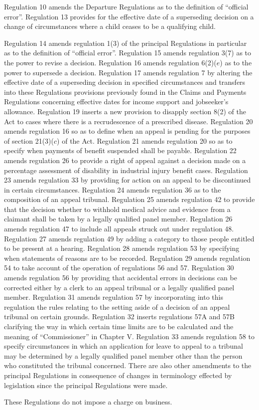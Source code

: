 \documentclass[12pt,a4paper]{article}
\begin{document}
Regulation 10 amends the Departure Regulations as to the definition of “official error”. Regulation 13 provides for the effective date of a superseding decision on a change of circumstances where a child ceases to be a qualifying child.

Regulation 14 amends regulation 1(3) of the principal Regulations in particular as to the definition of “official error”. Regulation 15 amends regulation 3(7) as to the power to revise a decision. Regulation 16 amends regulation 6(2)($e$)  as to the power to supersede a decision. Regulation 17 amends regulation 7 by altering the effective date of a superseding decision in specified circumstances and transfers into these Regulations provisions previously found in the Claims and Payments Regulations concerning effective dates for income support and jobseeker’s allowance. Regulation 19 inserts a new provision to disapply section 8(2) of the Act to cases where there is a recrudescence of a prescribed disease. Regulation 20 amends regulation 16 so as to define when an appeal is pending for the purposes of section 21(3)($c$)  of the Act. Regulation 21 amends regulation 20 so as to specify when payments of benefit suspended shall be payable. Regulation 22 amends regulation 26 to provide a right of appeal against a decision made on a percentage assessment of disability in industrial injury benefit cases. Regulation 23 amends regulation 33 by providing for action on an appeal to be discontinued in certain circumstances. Regulation 24 amends regulation 36 as to the composition of an appeal tribunal. Regulation 25 amends regulation 42 to provide that the decision whether to withhold medical advice and evidence from a claimant shall be taken by a legally qualified panel member. Regulation 26 amends regulation 47 to include all appeals struck out under regulation 48. Regulation 27 amends regulation 49 by adding a category to those people entitled to be present at a hearing. Regulation 28 amends regulation 53 by specifying when statements of reasons are to be recorded. Regulation 29 amends regulation 54 to take account of the operation of regulations 56 and 57. Regulation 30 amends regulation 56 by providing that accidental errors in decisions can be corrected either by a clerk to an appeal tribunal or a legally qualified panel member. Regulation 31 amends regulation 57 by incorporating into this regulation the rules relating to the setting aside of a decision of an appeal tribunal on certain grounds. Regulation 32 inserts regulations 57A and 57B clarifying the way in which certain time limits are to be calculated and the meaning of “Commissioner” in Chapter V. Regulation 33 amends regulation 58 to specify circumstances in which an application for leave to appeal to a tribunal may be determined by a legally qualified panel member other than the person who constituted the tribunal concerned. There are also other amendments to the principal Regulations in consequence of changes in terminology effected by legislation since the principal Regulations were made.

These Regulations do not impose a charge on business. 
\end{document}
